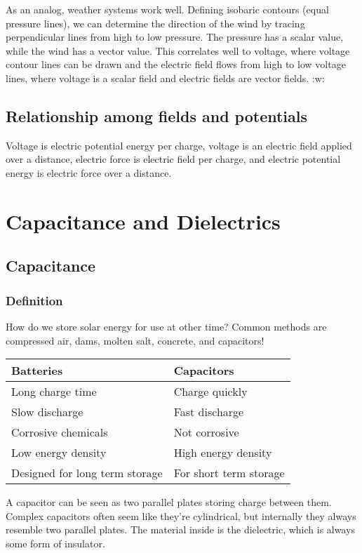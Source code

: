 \documentclass{article}
\begin{document}
As an analog, weather systems work well. Defining isobaric contours (equal pressure lines), we can determine the direction of the wind by tracing perpendicular lines from high to low pressure. The pressure has a scalar value, while the wind has a vector value. This correlates well to voltage, where voltage contour lines can be drawn and the electric field flows from high to low voltage lines, where voltage is a scalar field and electric fields are vector fields.
:w:
\subsection{Relationship among fields and potentials}

Voltage is electric potential energy per charge, voltage is an electric field applied over a distance, electric force is electric field per charge, and electric potential energy is electric force over a distance.

\section{Capacitance and Dielectrics}
\subsection{Capacitance}
\subsubsection{Definition}
How do we store solar energy for use at other time? Common methods are compressed air, dams, molten salt, concrete, and capacitors!\\
\begin{tabular}{l|l}
	Batteries & Capacitors \\
	\hline
	Long charge time & Charge quickly\\
	Slow discharge & Fast discharge \\
	Corrosive chemicals & Not corrosive \\
	Low energy density & High energy density \\
	Designed for long term storage & For short term storage \\
\end{tabular}

A capacitor can be seen as two parallel plates storing charge between them. Complex capacitors often seem like they're cylindrical, but internally they always resemble two parallel plates. The material inside is the dielectric, which is always some form of insulator.
\end{document}
